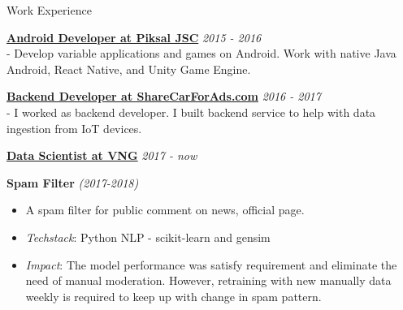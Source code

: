 \documentclass{resume} %
\begin{document}
\begin{rSection}{Work Experience}

{\bf \underline{Android Developer at Piksal JSC}} \hfill {\em 2015 - 2016}\\
- Develop variable applications and games on Android. Work with native Java Android, React Native, and Unity Game Engine. 

{\bf \underline{Backend Developer at ShareCarForAds.com}} \hfill {\em 2016 - 2017}\\
- I worked as backend developer. I built backend service to help with data ingestion from IoT devices. 

{\bf \underline{Data Scientist at VNG}} \hfill {\em 2017 - now}

\textbf{Spam Filter} \textit{(2017-2018)}

\begin{itemize}
    \item A spam filter for public comment on news, official page.
    \item \textit{Techstack}: Python NLP - scikit-learn and gensim
    \item \textit{Impact}: The model performance was satisfy requirement and eliminate the need of manual moderation. However, retraining with new manually data weekly is required to keep up with change in spam pattern.
\end{itemize}





\end{rSection}
\end{document}
